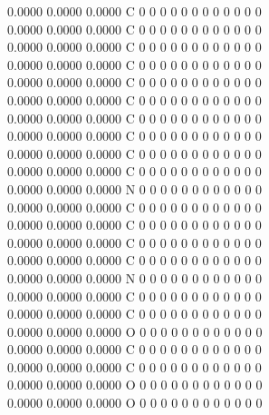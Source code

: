 \documentclass[11pt,titlepage,dvipdfmx,twoside]{jarticle}
\begin{document}
\begin{oframed}
{    0.0000    0.0000    0.0000  C  0  0  0  0  0  0  0  0  0  0  0  0      \\
    0.0000    0.0000    0.0000  C  0  0  0  0  0  0  0  0  0  0  0  0      \\
    0.0000    0.0000    0.0000  C  0  0  0  0  0  0  0  0  0  0  0  0      \\
    0.0000    0.0000    0.0000  C  0  0  0  0  0  0  0  0  0  0  0  0      \\
    0.0000    0.0000    0.0000  C  0  0  0  0  0  0  0  0  0  0  0  0      \\
    0.0000    0.0000    0.0000  C  0  0  0  0  0  0  0  0  0  0  0  0      \\
    0.0000    0.0000    0.0000  C  0  0  0  0  0  0  0  0  0  0  0  0      \\
    0.0000    0.0000    0.0000  C  0  0  0  0  0  0  0  0  0  0  0  0      \\
    0.0000    0.0000    0.0000  C  0  0  0  0  0  0  0  0  0  0  0  0      \\
    0.0000    0.0000    0.0000  C  0  0  0  0  0  0  0  0  0  0  0  0      \\
    0.0000    0.0000    0.0000  N  0  0  0  0  0  0  0  0  0  0  0  0      \\
    0.0000    0.0000    0.0000  C  0  0  0  0  0  0  0  0  0  0  0  0      \\
    0.0000    0.0000    0.0000  C  0  0  0  0  0  0  0  0  0  0  0  0      \\
    0.0000    0.0000    0.0000  C  0  0  0  0  0  0  0  0  0  0  0  0      \\
    0.0000    0.0000    0.0000  C  0  0  0  0  0  0  0  0  0  0  0  0      \\
    0.0000    0.0000    0.0000  N  0  0  0  0  0  0  0  0  0  0  0  0      \\
    0.0000    0.0000    0.0000  C  0  0  0  0  0  0  0  0  0  0  0  0      \\
    0.0000    0.0000    0.0000  C  0  0  0  0  0  0  0  0  0  0  0  0      \\
    0.0000    0.0000    0.0000  O  0  0  0  0  0  0  0  0  0  0  0  0      \\
    0.0000    0.0000    0.0000  C  0  0  0  0  0  0  0  0  0  0  0  0      \\
    0.0000    0.0000    0.0000  C  0  0  0  0  0  0  0  0  0  0  0  0      \\
    0.0000    0.0000    0.0000  O  0  0  0  0  0  0  0  0  0  0  0  0      \\
    0.0000    0.0000    0.0000  O  0  0  0  0  0  0  0  0  0  0  0  0      \\
}
\end{oframed}
\end{document}
